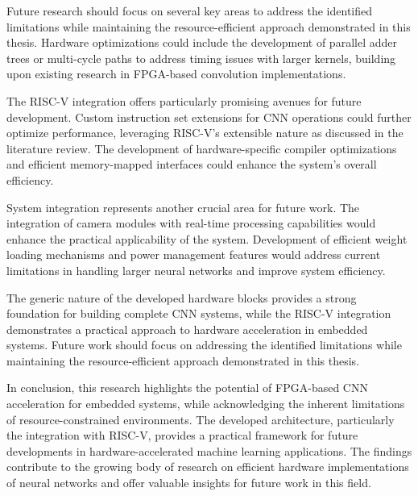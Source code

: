 Future research should focus on several key areas to address the identified limitations while maintaining the resource-efficient approach demonstrated in this thesis. Hardware optimizations could include the development of parallel adder trees or multi-cycle paths to address timing issues with larger kernels, building upon existing research in FPGA-based convolution implementations.

The RISC-V integration offers particularly promising avenues for future development. Custom instruction set extensions for CNN operations could further optimize performance, leveraging RISC-V's extensible nature as discussed in the literature review. The development of hardware-specific compiler optimizations and efficient memory-mapped interfaces could enhance the system's overall efficiency.

System integration represents another crucial area for future work. The integration of camera modules with real-time processing capabilities would enhance the practical applicability of the system. Development of efficient weight loading mechanisms and power management features would address current limitations in handling larger neural networks and improve system efficiency.

The generic nature of the developed hardware blocks provides a strong foundation for building complete CNN systems, while the RISC-V integration demonstrates a practical approach to hardware acceleration in embedded systems. Future work should focus on addressing the identified limitations while maintaining the resource-efficient approach demonstrated in this thesis.

In conclusion, this research highlights the potential of FPGA-based CNN acceleration for embedded systems, while acknowledging the inherent limitations of resource-constrained environments. The developed architecture, particularly the integration with RISC-V, provides a practical framework for future developments in hardware-accelerated machine learning applications. The findings contribute to the growing body of research on efficient hardware implementations of neural networks and offer valuable insights for future work in this field.


